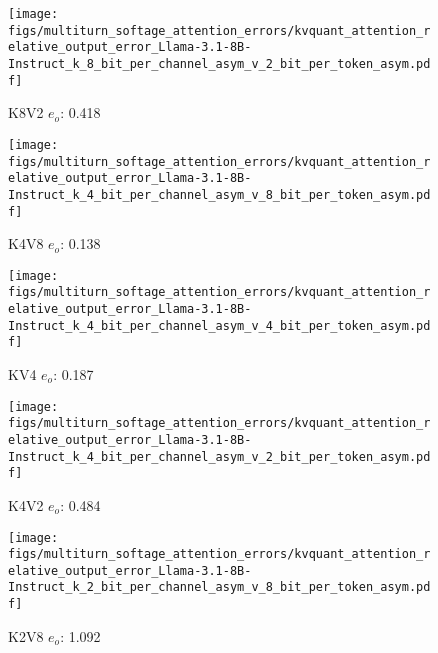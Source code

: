 \begin{figure*}
\begin{subfigure}{0.25\columnwidth}
    \end{subfigure}
    \begin{subfigure}{0.25\columnwidth}
    \texttt{[image: figs/multiturn\_softage\_attention\_errors/kvquant\_attention\_relative\_output\_error\_Llama-3.1-8B-Instruct\_k\_8\_bit\_per\_channel\_asym\_v\_2\_bit\_per\_token\_asym.pdf]}
    \caption{K8V2 $e_o$: 0.418}
    \label{fig:kvcache_simulated_quant_error_layer_wise_k8_bit_per_channel_asym_v2_per_token_asym_Llama3.1-8B-Instruct_multirurn_softage}
    \end{subfigure}
    \begin{subfigure}{0.25\columnwidth}
    \texttt{[image: figs/multiturn\_softage\_attention\_errors/kvquant\_attention\_relative\_output\_error\_Llama-3.1-8B-Instruct\_k\_4\_bit\_per\_channel\_asym\_v\_8\_bit\_per\_token\_asym.pdf]}
    \caption{K4V8 $e_o$: 0.138}
    \label{fig:kvcache_simulated_quant_error_layer_wise_k4_bit_per_channel_asym_v8_per_token_asym_Llama3.1-8B-Instruct_multirurn_softage}
    \end{subfigure}
    \begin{subfigure}{0.25\columnwidth}
    \texttt{[image: figs/multiturn\_softage\_attention\_errors/kvquant\_attention\_relative\_output\_error\_Llama-3.1-8B-Instruct\_k\_4\_bit\_per\_channel\_asym\_v\_4\_bit\_per\_token\_asym.pdf]}
    \caption{KV4 $e_o$: 0.187}
    \label{fig:kvcache_simulated_quant_error_layer_wise_k4_bit_per_channel_asym_v4_per_token_asym_Llama3.1-8B-Instruct_multirurn_softage}
    \end{subfigure}
    \begin{subfigure}{0.25\columnwidth}
    \texttt{[image: figs/multiturn\_softage\_attention\_errors/kvquant\_attention\_relative\_output\_error\_Llama-3.1-8B-Instruct\_k\_4\_bit\_per\_channel\_asym\_v\_2\_bit\_per\_token\_asym.pdf]}
    \caption{K4V2 $e_o$: 0.484}
    \label{fig:kvcache_simulated_quant_error_layer_wise_k4_bit_per_channel_asym_v2_per_token_asym_Llama3.1-8B-Instruct_multirurn_softage}
    \end{subfigure}
    \begin{subfigure}{0.25\columnwidth}
    \texttt{[image: figs/multiturn\_softage\_attention\_errors/kvquant\_attention\_relative\_output\_error\_Llama-3.1-8B-Instruct\_k\_2\_bit\_per\_channel\_asym\_v\_8\_bit\_per\_token\_asym.pdf]}
    \caption{K2V8 $e_o$: 1.092}
    \label{fig:kvcache_simulated_quant_error_layer_wise_k2_bit_per_channel_asym_v8_per_token_asym_Llama3.1-8B-Instruct_multirurn_softage}
    \end{subfigure}
    \begin{subfigure}{0.25\columnwidth}

\end{subfigure}
\end{figure*}
